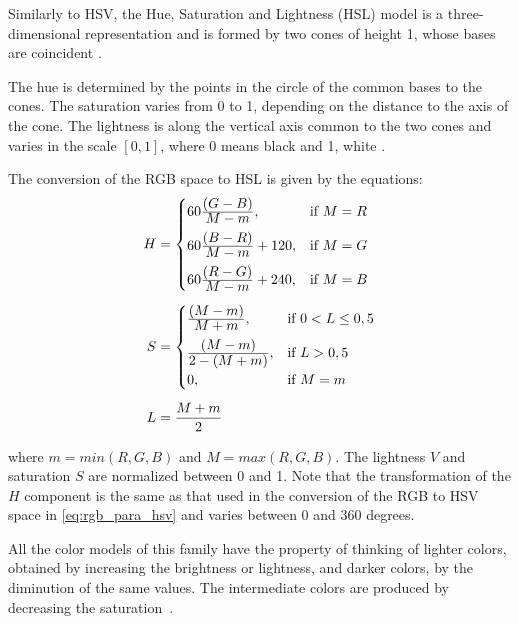 Similarly to HSV, the Hue, Saturation and Lightness (HSL) model is a three-dimensional representation and is formed by two cones of height 1, whose bases are coincident \citep{pedrini:08}.

The hue is determined by the points in the circle of the common bases to the cones. The saturation varies from 0 to 1, depending on the distance to the axis of the cone. The lightness is along the vertical axis common to the two cones and varies in the scale $[0, 1]$, where 0 means black and 1, white \citep{pedrini:08}.

The conversion of the RGB space to HSL is given by the equations:
\begin{align}
\label{eq:rgb_para_hsl}
\begin{split}
  H &=  \begin{cases}
            60\frac{\displaystyle (G - B)}{\displaystyle M - m}, & \text{if}\ M = R\\[0.7em]
            60\frac{\displaystyle (B - R)}{\displaystyle M - m} + 120, & \text{if}\ M = G\\[0.7em]
            60\frac{\displaystyle (R - G)}{\displaystyle M - m} + 240, & \text{if}\ M = B
       \end{cases}
  \\[0.5em]
  S &=  \begin{cases}
            \frac{\displaystyle (M - m)}{\displaystyle M + m}, & \text{if}\ 0 < L \leq 0,5\\[0.7em]
            \frac{\displaystyle (M - m)}{\displaystyle 2 - (M + m)}, & \text{if}\ L > 0,5\\[0.5em]
            0, & \text{if}\ M = m\\
       \end{cases}
  \\[0.5em]
  L &= \frac{M + m}{2}
\end{split}
\end{align}

\noindent where $m = min(R, G ,B)$ and $M = max(R, G ,B)$. The lightness $V$ and saturation $S$ are normalized between 0 and 1. Note that the transformation of the $H$ component is the same as that used in the conversion of the RGB to HSV space in \ref{eq:rgb_para_hsv} and varies between 0 and 360 degrees.

All the color models of this family have the property of thinking of lighter colors, obtained by increasing the brightness or lightness, and darker colors, by the diminution of the same values. The intermediate colors are produced by decreasing the saturation~\citep{pedrini:08}.